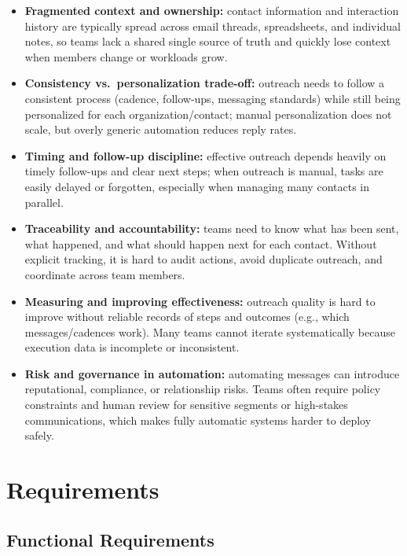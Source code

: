 \documentclass[a4paper]{article}
\begin{document}
\begin{itemize}
  \item \textbf{Fragmented context and ownership:} contact information and interaction history are typically spread across email threads, spreadsheets, and individual notes, so teams lack a shared single source of truth and quickly lose context when members change or workloads grow.

  \item \textbf{Consistency vs.\ personalization trade-off:} outreach needs to follow a consistent process (cadence, follow-ups, messaging standards) while still being personalized for each organization/contact; manual personalization does not scale, but overly generic automation reduces reply rates.

  \item \textbf{Timing and follow-up discipline:} effective outreach depends heavily on timely follow-ups and clear next steps; when outreach is manual, tasks are easily delayed or forgotten, especially when managing many contacts in parallel.

  \item \textbf{Traceability and accountability:} teams need to know what has been sent, what happened, and what should happen next for each contact. Without explicit tracking, it is hard to audit actions, avoid duplicate outreach, and coordinate across team members.

  \item \textbf{Measuring and improving effectiveness:} outreach quality is hard to improve without reliable records of steps and outcomes (e.g., which messages/cadences work). Many teams cannot iterate systematically because execution data is incomplete or inconsistent.

  \item \textbf{Risk and governance in automation:} automating messages can introduce reputational, compliance, or relationship risks. Teams often require policy constraints and human review for sensitive segments or high-stakes communications, which makes fully automatic systems harder to deploy safely.
\end{itemize}

\newpage
\section{Requirements}
\label{ch:requirements}
\subsection{Functional Requirements}
\end{document}
